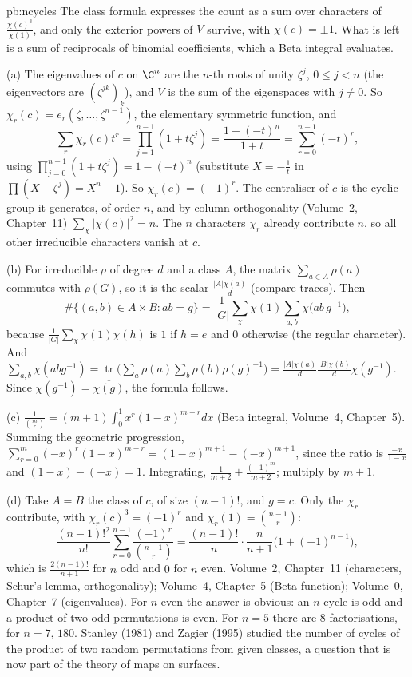 \begin{solution}{pb:ncycles}
\idea The class formula expresses the count as a sum over characters of $\frac{\chi(c)^3}{\chi(1)}$, and only the exterior powers
of $V$ survive, with $\chi(c)=\pm1$. What is left is a sum of reciprocals of binomial coefficients, which a Beta integral evaluates.

\writeup (a) The eigenvalues of $c$ on $\C^n$ are the $n$-th roots of unity $\zeta^j$, $0\le j<n$ (the eigenvectors are
$(\zeta^{jk})_k$), and $V$ is the sum of the eigenspaces with $j\ne0$. So $\chi_r(c)=e_r(\zeta,\dots,\zeta^{n-1})$, the elementary
symmetric function, and
\[
\sum_r\chi_r(c)t^r=\prod_{j=1}^{n-1}(1+t\zeta^j)=\frac{1-(-t)^n}{1+t}=\sum_{r=0}^{n-1}(-t)^r,
\]
using $\prod_{j=0}^{n-1}(1+t\zeta^j)=1-(-t)^n$ (substitute $X=-\frac1t$ in $\prod(X-\zeta^j)=X^n-1$). So $\chi_r(c)=(-1)^r$. The
centraliser of $c$ is the cyclic group it generates, of order $n$, and by column orthogonality (Volume~2, Chapter~11)
$\sum_\chi|\chi(c)|^2=n$. The $n$ characters $\chi_r$ already contribute $n$, so all other irreducible characters vanish at $c$.

(b) For irreducible $\rho$ of degree $d$ and a class $A$, the matrix $\sum_{a\in A}\rho(a)$ commutes with $\rho(G)$, so it is the
scalar $\frac{|A|\chi(a)}d$ (compare traces). Then
\[
\#\{(a,b)\in A\times B:ab=g\}=\frac1{|G|}\sum_\chi\chi(1)\sum_{a,b}\chi\bigl(ab\,g^{-1}\bigr),
\]
because $\frac1{|G|}\sum_\chi\chi(1)\chi(h)$ is $1$ if $h=e$ and $0$ otherwise (the regular character). And
$\sum_{a,b}\chi(abg^{-1})=\operatorname{tr}\bigl(\sum_a\rho(a)\sum_b\rho(b)\rho(g)^{-1}\bigr)=\frac{|A|\chi(a)}d\frac{|B|\chi(b)}d\chi(g^{-1})$. Since
$\chi(g^{-1})=\overline{\chi(g)}$, the formula follows.

(c) $\frac1{\binom mr}=(m+1)\int_0^1x^r(1-x)^{m-r}dx$ (Beta integral, Volume~4, Chapter~5). Summing the geometric progression,
$\sum_{r=0}^m(-x)^r(1-x)^{m-r}=(1-x)^{m+1}-(-x)^{m+1}$, since the ratio is $\frac{-x}{1-x}$ and $(1-x)-(-x)=1$. Integrating,
$\frac1{m+2}+\frac{(-1)^m}{m+2}$; multiply by $m+1$.

(d) Take $A=B$ the class of $c$, of size $(n-1)!$, and $g=c$. Only the $\chi_r$ contribute, with $\chi_r(c)^3=(-1)^r$ and
$\chi_r(1)=\binom{n-1}r$:
\[
\frac{(n-1)!^2}{n!}\sum_{r=0}^{n-1}\frac{(-1)^r}{\binom{n-1}r}=\frac{(n-1)!}n\cdot\frac n{n+1}\bigl(1+(-1)^{n-1}\bigr),
\]
which is $\frac{2(n-1)!}{n+1}$ for $n$ odd and $0$ for $n$ even.
\tools Volume~2, Chapter~11 (characters, Schur's lemma, orthogonality); Volume~4, Chapter~5 (Beta function); Volume~0, Chapter~7 (eigenvalues).
\leads For $n$ even the answer is obvious: an $n$-cycle is odd and a product of two odd permutations is even. For $n=5$ there are $8$
factorisations, for $n=7$, $180$. Stanley (1981) and Zagier (1995) studied the number of cycles of the product of two random
permutations from given classes, a question that is now part of the theory of maps on surfaces.
\end{solution}

